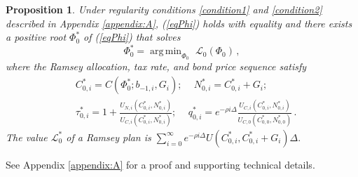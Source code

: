 \documentclass[12pt]{article}
\DeclareMathOperator*{\argmin}{arg\,min}
\newtheorem{proposition}{Proposition}
\begin{document}
\begin{proposition} \label{proplag} 
	{Under  regularity conditions \ref{condition1} and \ref{condition2} described in Appendix \ref{appendix:A}}, 
	(\ref{eqPhi}) holds with equality and there  exists  a positive root  $\Phi_0^*$ of  (\ref{eqPhi}) that solves
	\begin{equation*}
		\Phi_0^*  = \argmin_{\Phi_0}  \,\,  \mathcal{L}_0(\Phi_0)\, , %
	\end{equation*}	
	where the    Ramsey allocation,  tax rate, and bond price  sequence satisfy
	\begin{eqnarray}
		&	 {C}^\ast_{0, i} =     C(\Phi_0^{*}; b_{-1, i}, G_{i}); \, \quad  
		{N}^*_{0, i}  =    {C}_{0, i}^\ast +G_{i} ;  \label{RamseyC} \\
		&	  {\tau}^*_{0, i} =  1+\frac{U_{N, i}({C}^*_{0, i}, {N}^*_{0, i})}{U_{C, i}({C}^*_{0, i}, {N}^*_{0, i})};\,   \quad
		{q}^*_{0, i}  = e^{-\rho i\Delta}\frac{U_{C, i}({C}^*_{0, i}, {N}^*_{0, i})}{U_{C, 0}({C}^*_{0, 0}, {N}^*_{0, 0})} \label{Ramseytaxprice} \, .
	\end{eqnarray}
	The value ${\mathcal L}^{*}_0 $ of a Ramsey plan is
		$	 \sum_{i=0}^{\infty}  e^{-\rho i\Delta} U(	{C}^*_{0, i}, {C}^*_{0, i}+G_{
			i})  \Delta.
		$	%
	\end{proposition}
	See Appendix \ref{appendix:A} for a proof and supporting technical details. 
	
\end{document}
